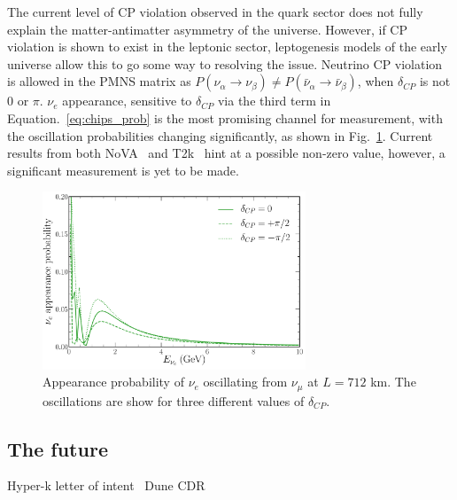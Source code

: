 The current level of CP violation observed in the quark sector does not fully explain the
matter-antimatter asymmetry of the universe. However, if CP violation is shown to exist in the
leptonic sector, leptogenesis models of the early universe allow this to go some way to resolving
the issue. Neutrino CP violation is allowed in the PMNS matrix as
$P(\nu_{\alpha}\rightarrow\nu_{\beta}) \neq P(\bar{\nu}_{\alpha}\rightarrow\bar{\nu}_{\beta})$,
when $\delta_{CP}$ is not 0 or $\pi$. $\nu_{e}$ appearance, sensitive to $\delta_{CP}$ via the
third term in Equation.~\ref{eq:chips_prob} is the most promising channel for measurement, with
the oscillation probabilities changing significantly, as shown in Fig.~\ref{fig:osc_cp_probs}.
Current results from both NoVA~\cite{acero2019} and T2k~\cite{abe2018_2} hint at a possible
non-zero value, however, a significant measurement is yet to be made.

\begin{figure} %
    \includegraphics[origin=c,width=0.7\textwidth]{diagrams/6-cvn/chipsnet/explore_osc_cp_probs.pdf}
    \caption[$\nu_{e}$ appearance probability for different $\delta_{CP}$ values]
    {Appearance probability of $\nu_{e}$ oscillating from $\nu_{\mu}$ at $L=712$ km. The
        oscillations are show for three different values of $\delta_{CP}$.}
    \label{fig:osc_cp_probs}
\end{figure}


\subsection{The future} %
\label{sec:theory_status_future} %

Hyper-k letter of intent~\cite{abe2011}
Dune CDR~\cite{acciarri2016}

